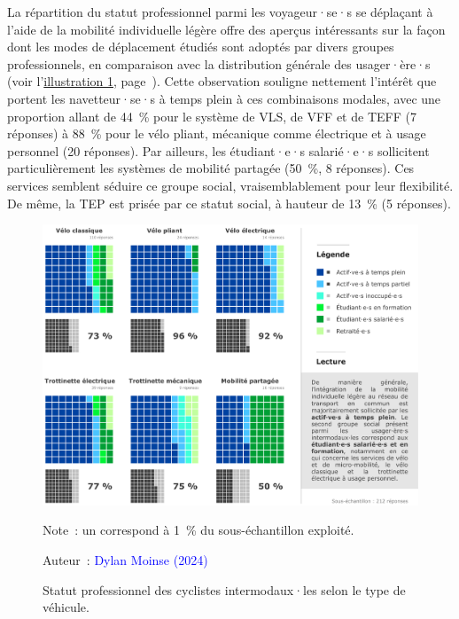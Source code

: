 \begin{refsegment}

La répartition du statut professionnel parmi les voyageur·se·s se déplaçant à l'aide de la mobilité individuelle légère offre des aperçus intéressants sur la façon dont les modes de déplacement étudiés sont adoptés par divers groupes professionnels, en comparaison avec la distribution générale des usager·ère·s (voir l'\hyperref[fig-chap4:statut-social]{illustration \ref{fig-chap4:statut-social}}, page~\pageref{fig-chap4:statut-social}). Cette observation souligne nettement l'intérêt que portent les navetteur·se·s à temps plein à ces combinaisons modales, avec une proportion allant de 44~\% pour le système de \acrshort{VLS}, de \acrshort{VFF} et de \acrshort{TEFF} (7 réponses) à 88~\% pour le vélo pliant, mécanique comme électrique et à usage personnel (20 réponses). Par ailleurs, les étudiant·e·s salarié·e·s sollicitent particulièrement les systèmes de mobilité partagée (50~\%, 8 réponses). Ces services semblent séduire ce groupe social, vraisemblablement pour leur flexibilité. De même, la \acrshort{TEP} est prisée par ce statut social, à hauteur de 13~\% (5 réponses).%

    \begin{figure}[h!]\vspace*{4pt}
        \caption{Statut professionnel des cyclistes intermodaux·les selon le type de véhicule.}
        \label{fig-chap4:statut-social}
        \centerline{\includegraphics[width=1\columnwidth]{src/Figures/Chap-4/FR_Statut.pdf}}
        \vspace{5pt}
        \begin{flushleft}\scriptsize{
        Note~: un  correspond à 1~\% du sous-échantillon exploité.
        }\end{flushleft}
        \begin{flushright}\scriptsize{
        Auteur~: \textcolor{blue}{Dylan Moinse (2024)}
        }\end{flushright}
    \end{figure}


\end{refsegment}
